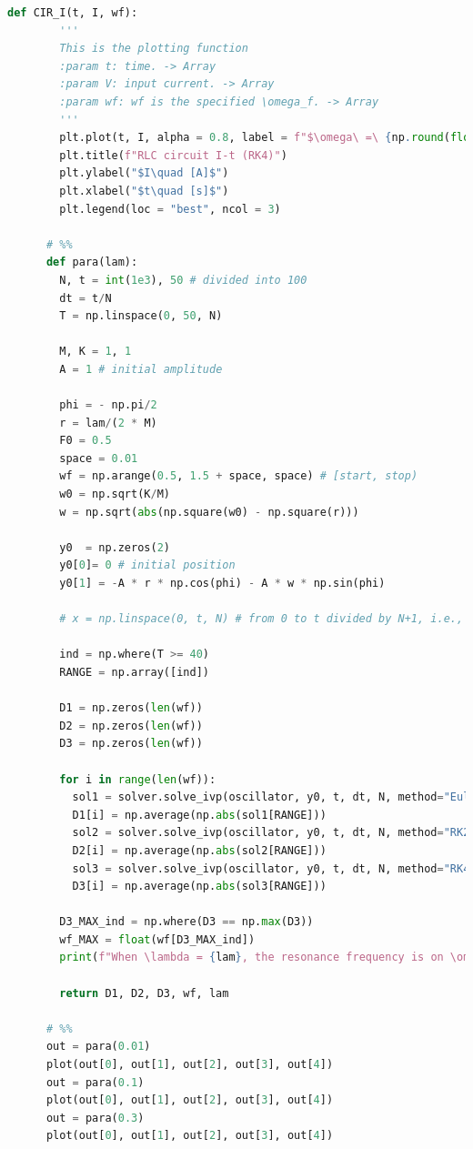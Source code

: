 \documentclass[12pt]{article}
\begin{document}
\begin{lstlisting}[language={Python}]
      def CIR_I(t, I, wf):
        '''
        This is the plotting function
        :param t: time. -> Array
        :param V: input current. -> Array
        :param wf: wf is the specified \omega_f. -> Array
        '''
        plt.plot(t, I, alpha = 0.8, label = f"$\omega\ =\ {np.round(float(wf), 2)}$")
        plt.title(f"RLC circuit I-t (RK4)")
        plt.ylabel("$I\quad [A]$")
        plt.xlabel("$t\quad [s]$")
        plt.legend(loc = "best", ncol = 3)

      # %%
      def para(lam):
        N, t = int(1e3), 50 # divided into 100
        dt = t/N
        T = np.linspace(0, 50, N)

        M, K = 1, 1
        A = 1 # initial amplitude

        phi = - np.pi/2
        r = lam/(2 * M)
        F0 = 0.5
        space = 0.01
        wf = np.arange(0.5, 1.5 + space, space) # [start, stop)
        w0 = np.sqrt(K/M)
        w = np.sqrt(abs(np.square(w0) - np.square(r)))

        y0  = np.zeros(2)
        y0[0]= 0 # initial position
        y0[1] = -A * r * np.cos(phi) - A * w * np.sin(phi)

        # x = np.linspace(0, t, N) # from 0 to t divided by N+1, i.e., N+1 equal parts.

        ind = np.where(T >= 40)
        RANGE = np.array([ind])

        D1 = np.zeros(len(wf))
        D2 = np.zeros(len(wf))
        D3 = np.zeros(len(wf))

        for i in range(len(wf)):
          sol1 = solver.solve_ivp(oscillator, y0, t, dt, N, method="Euler", args=(lam, wf[i], F0, K, M))[0]
          D1[i] = np.average(np.abs(sol1[RANGE]))
          sol2 = solver.solve_ivp(oscillator, y0, t, dt, N, method="RK2", args=(lam, wf[i], F0, K, M))[0]
          D2[i] = np.average(np.abs(sol2[RANGE]))
          sol3 = solver.solve_ivp(oscillator, y0, t, dt, N, method="RK4", args=(lam, wf[i], F0, K, M))[0]
          D3[i] = np.average(np.abs(sol3[RANGE]))

        D3_MAX_ind = np.where(D3 == np.max(D3))
        wf_MAX = float(wf[D3_MAX_ind])
        print(f"When \lambda = {lam}, the resonance frequency is on \omega_f = {wf_MAX}, and the average amplitude is D = {float(np.max(D3))}.")
        
        return D1, D2, D3, wf, lam

      # %%
      out = para(0.01)
      plot(out[0], out[1], out[2], out[3], out[4])
      out = para(0.1)
      plot(out[0], out[1], out[2], out[3], out[4])
      out = para(0.3)
      plot(out[0], out[1], out[2], out[3], out[4])


\end{lstlisting}
\end{document}
